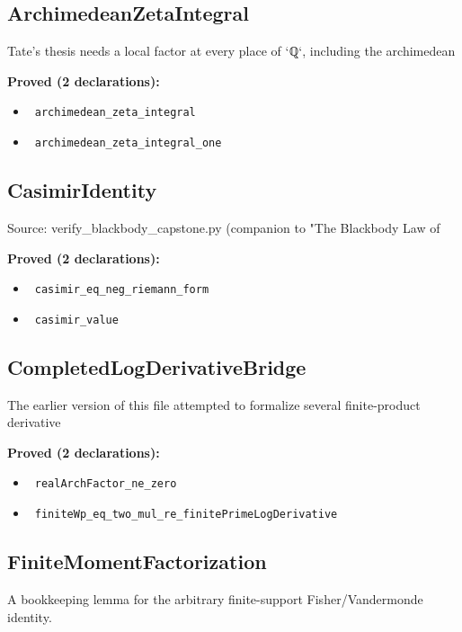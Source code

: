 \documentclass{report}
\theoremstyle{definition}
\begin{document}
\subsection{ArchimedeanZetaIntegral}
Tate's thesis needs a local factor at every place of `ℚ`, including the archimedean

\noindent\textbf{Proved (2 declarations):}
\begin{itemize}
  \item {}\leanok\ \texttt{archimedean\_zeta\_integral}
  \item {}\leanok\ \texttt{archimedean\_zeta\_integral\_one}
\end{itemize}

\subsection{CasimirIdentity}
Source: verify\_blackbody\_capstone.py (companion to "The Blackbody Law of

\noindent\textbf{Proved (2 declarations):}
\begin{itemize}
  \item {}\leanok\ \texttt{casimir\_eq\_neg\_riemann\_form}
  \item {}\leanok\ \texttt{casimir\_value}
\end{itemize}

\subsection{CompletedLogDerivativeBridge}
The earlier version of this file attempted to formalize several finite-product derivative

\noindent\textbf{Proved (2 declarations):}
\begin{itemize}
  \item {}\leanok\ \texttt{realArchFactor\_ne\_zero}
  \item {}\leanok\ \texttt{finiteWp\_eq\_two\_mul\_re\_finitePrimeLogDerivative}
\end{itemize}

\subsection{FiniteMomentFactorization}
A bookkeeping lemma for the arbitrary finite-support Fisher/Vandermonde identity.
\end{document}
